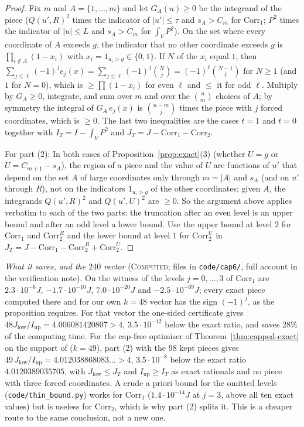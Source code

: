 \documentclass[11pt]{amsart}
\theoremstyle{definition}
\theoremstyle{remark}
\newcommand{\lbl}[1]{\textup{\textsc{#1}}}
\begin{document}
\begin{proof}
Fix $m$ and $A=\{1,\dots,m\}$ and let $G_A(u)\ge0$ be the integrand of the
piece ($Q(u',R)^2$ times the indicator of $|u'|\le\tau$ and $s_A>C_m$ for
$\mathrm{Corr}_1$; $P^2$ times the indicator of $|u|\le L$ and $s_A>C_m$ for
$\int_VP^2$). On the set where every coordinate of $A$ exceeds $g$, the
indicator that no other coordinate exceeds $g$ is $\prod_{i\notin A}(1-x_i)$
with $x_i=1_{u_i>g}\in\{0,1\}$. If $N$ of the $x_i$ equal $1$, then
$\sum_{j\le\ell}(-1)^je_j(x)=\sum_{j\le\ell}(-1)^j\binom Nj=(-1)^\ell\binom{N-1}{\ell}$
for $N\ge1$ (and $1$ for $N=0$), which is $\ge\prod(1-x_i)$ for even $\ell$ and
$\le$ it for odd $\ell$. Multiply by $G_A\ge0$, integrate, and sum over $m$
and over the $\binom nm$ choices of $A$; by symmetry the integral of
$G_A\,e_j(x)$ is $\binom{n-m}{j}$ times the piece with $j$ forced
coordinates, which is $\ge0$. The last two inequalities are the cases $t=1$
and $t=0$ together with $I_T=I-\int_VP^2$ and
$J_T=J-\mathrm{Corr}_1-\mathrm{Corr}_2$.

For part (2): In both cases of Proposition~\ref{prop:exact}(3) (whether $U=g$ or
$U=C_{m+1}-s_A$), the region of a piece and the value of $U$ are functions
of $u'$ that depend on the set $A$ of large coordinates only through $m=|A|$
and $s_A$ (and on $u'$ through $R$), not on the indicators $1_{u_i>g}$ of the
other coordinates; given $A$, the integrands $Q(u',R)^2$ and $Q(u',U)^2$ are $\ge0$. So the argument above applies verbatim to each of the two parts: the
truncation after an even level is an upper bound and after an odd level a
lower bound. Use the upper bound at level $2$ for $\mathrm{Corr}_1$ and
$\mathrm{Corr}_2^R$ and the lower bound at level $1$ for $\mathrm{Corr}_2^U$
in $J_T=J-\mathrm{Corr}_1-\mathrm{Corr}_2^R+\mathrm{Corr}_2^U$.
\end{proof}

\begin{sloppypar}\noindent\emph{What it saves, and the $240$ vector} (\lbl{Computed}; files in
\texttt{code/cap6/}, full account in the verification note). On the witness of
\cite{SY26} the levels $j=0,\dots,3$ of $\mathrm{Corr}_1$ are $2.3\cdot10^{-6}J$,
$-1.7\cdot10^{-10}J$, $7.0\cdot10^{-20}J$ and $-2.5\cdot10^{-69}J$; every exact
piece computed there and for our own $k=48$ vector has the sign $(-1)^j$, as the
proposition requires. For that vector the one-sided certificate gives
$48J_{\mathrm{low}}/I_{\mathrm{up}}=4.006081420807>4$, $3.5\cdot10^{-12}$ below the
exact ratio, and saves $28\%$ of the computing time. For the cap-free optimiser
of Theorem~\ref{thm:capped-exact} on the support of \cite{Sta26} ($k=49$), part
(2) with the $98$ kept pieces gives $49\,J_{\mathrm{low}}/I_{\mathrm{up}}=4.012038868083\ldots>4$,
$3.5\cdot10^{-8}$ below the exact ratio $4.0120389035705$, with $J_{\mathrm{low}}\le
J_T$ and $I_{\mathrm{up}}\ge I_T$ as exact rationals and no piece with three forced
coordinates. A crude a priori bound for the omitted levels
(\texttt{code/thin\_bound.py}) works for $\mathrm{Corr}_1$ ($1.4\cdot10^{-14}J$ at
$j=3$, above all ten exact values) but is useless for $\mathrm{Corr}_2$, which is
why part (2) splits it. This is a cheaper route to the same conclusion, not a new one.
\end{sloppypar}
\end{document}
